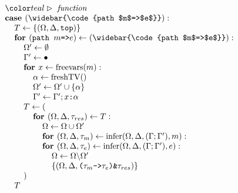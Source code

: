 \documentclass[acmsmall]{acmart}
\begin{document}
\begin{figure*}[h]
\[\begin{array}[t]{@{} l}
    \\

    \I \C{function}
    \\
    \I \B{case } (\widebar{\code{path $m$=>$e$}})  :  
    \\
    \I\I T \leftarrow \{(\Omega, \Delta, \code{top})\}
    \\
    \I\I \B{for } (\code{path $m$=>$e$}) \leftarrow (\widebar{\code{path $m$=>$e$}}): 
    \\
    \I\I\I \Omega' \leftarrow \emptyset
    \\
    \I\I\I \Gamma' \leftarrow \bullet
    \\
    \I\I\I \B{for } x \leftarrow \F{freevars}(m):
    \\
    \I\I\I\I \alpha \leftarrow \F{freshTV}() 
    \\
    \I\I\I\I \Omega' \leftarrow \Omega' \cup \{\alpha\} 
    \\
    \I\I\I\I \Gamma' \leftarrow \Gamma';\code{$x$:$\alpha$}
    \\
    \I\I\I T \leftarrow (
    \\
    \I\I\I\I \B{for } (\Omega, \Delta, \tau_{res}) \leftarrow T: 
    \\
    \I\I\I\I\I \Omega \leftarrow \Omega \cup \Omega'
    \\
    \I\I\I\I\I \B{for } (\Omega, \Delta, \tau_{m}) \leftarrow \F{infer}(\Omega, \Delta, (\Gamma;\Gamma'), m): 
    \\
    \I\I\I\I\I \B{for } (\Omega, \Delta, \tau_{e}) \leftarrow \F{infer}(\Omega, \Delta, (\Gamma;\Gamma'), e): 
    \\
    \I\I\I\I\I\I \Omega \leftarrow \Omega \backslash \Omega'
    \\
    \I\I\I\I\I\I \{(\Omega, \Delta, \code{($\tau_{m}$->$\tau_{e}$)\&$\tau_{res}$})\}
    \\
    \I\I\I )
    \\
    \I\I T

    \\


\end{array}\]
\end{figure*}
\end{document}
